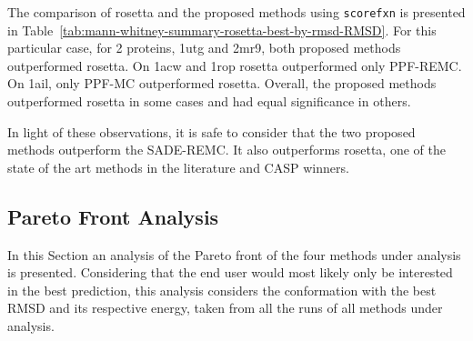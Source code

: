 The comparison of rosetta and the proposed methods using \texttt{scorefxn}
is presented in Table~\ref{tab:mann-whitney-summary-rosetta-best-by-rmsd-RMSD}.
For this particular case, for 2 proteins, 1utg and 2mr9, both proposed
methods outperformed rosetta. On 1acw and 1rop rosetta outperformed only
PPF-REMC. On 1ail, only PPF-MC outperformed rosetta. Overall,
the proposed methods outperformed rosetta in some cases and had equal
significance in others.

In light of these observations, it is safe to consider that the two proposed
methods outperform the SADE-REMC. It also outperforms rosetta, one of
the state of the art methods in the literature and CASP winners.

\subsection{Pareto Front Analysis}\label{sec:pareto-front-analysis}

In this Section an analysis of the Pareto front of the four methods under
analysis is presented.
Considering that the end user would most likely only be
interested in the best prediction, this analysis considers the conformation with
the best RMSD and its respective energy, taken from all the runs of all methods under
analysis.

